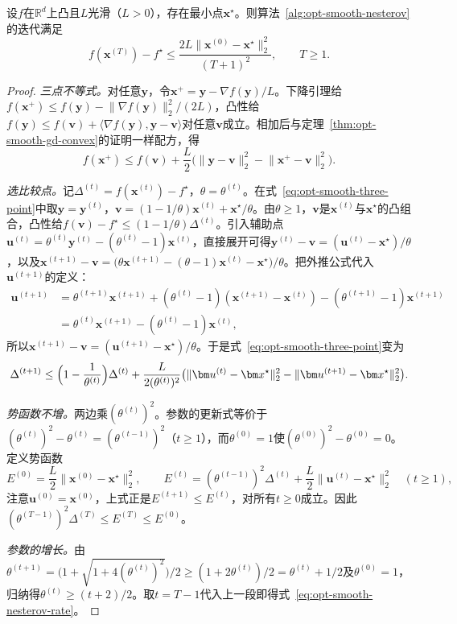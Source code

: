 \begin{theorem}[Nesterov方法的收敛速度]
\label{thm:opt-smooth-nesterov}
设$f$在$\mathbb R^d$上凸且$L$光滑（$L>0$），存在最小点$\bm x^\star$。则算法~\ref{alg:opt-smooth-nesterov}的迭代满足
\begin{equation}
\label{eq:opt-smooth-nesterov-rate}
  f(\bm x^{(T)})-f^\star\leq\frac{2L\lVert\bm x^{(0)}-\bm x^\star\rVert_2^2}{(T+1)^2},\qquad T\geq1 .
\end{equation}
\end{theorem}

\begin{proof}
\emph{三点不等式。}对任意$\bm y$，令$\bm x^+=\bm y-\nabla f(\bm y)/L$。下降引理给$f(\bm x^+)\leq f(\bm y)-\lVert\nabla f(\bm y)\rVert_2^2/(2L)$，凸性给$f(\bm y)\leq f(\bm v)+\langle\nabla f(\bm y),\bm y-\bm v\rangle$对任意$\bm v$成立。相加后与定理~\ref{thm:opt-smooth-gd-convex}的证明一样配方，得
\begin{equation}
\label{eq:opt-smooth-three-point}
  f(\bm x^+)\leq f(\bm v)+\frac L2\bigl(\lVert\bm y-\bm v\rVert_2^2-\lVert\bm x^+-\bm v\rVert_2^2\bigr).
\end{equation}

\emph{选比较点。}记$\Delta^{(t)}=f(\bm x^{(t)})-f^\star$，$\theta=\theta^{(t)}$。在式~\eqref{eq:opt-smooth-three-point}中取$\bm y=\bm y^{(t)}$，$\bm v=(1-1/\theta)\bm x^{(t)}+\bm x^\star/\theta$。由$\theta\geq1$，$\bm v$是$\bm x^{(t)}$与$\bm x^\star$的凸组合，凸性给$f(\bm v)-f^\star\leq(1-1/\theta)\Delta^{(t)}$。引入辅助点$\bm u^{(t)}=\theta^{(t)}\bm y^{(t)}-(\theta^{(t)}-1)\bm x^{(t)}$，直接展开可得$\bm y^{(t)}-\bm v=(\bm u^{(t)}-\bm x^\star)/\theta$，以及$\bm x^{(t+1)}-\bm v=\bigl(\theta\bm x^{(t+1)}-(\theta-1)\bm x^{(t)}-\bm x^\star\bigr)/\theta$。把外推公式代入$\bm u^{(t+1)}$的定义：
\[
  \begin{aligned}
  \bm u^{(t+1)}&=\theta^{(t+1)}\bm x^{(t+1)}+(\theta^{(t)}-1)(\bm x^{(t+1)}-\bm x^{(t)})-(\theta^{(t+1)}-1)\bm x^{(t+1)}\\
  &=\theta^{(t)}\bm x^{(t+1)}-(\theta^{(t)}-1)\bm x^{(t)},
  \end{aligned}
\]
所以$\bm x^{(t+1)}-\bm v=(\bm u^{(t+1)}-\bm x^\star)/\theta$。于是式~\eqref{eq:opt-smooth-three-point}变为
\[
  \Delta^{(t+1)}\leq\Bigl(1-\frac1{\theta^{(t)}}\Bigr)\Delta^{(t)}+\frac{L}{2(\theta^{(t)})^2}\bigl(\lVert\bm u^{(t)}-\bm x^\star\rVert_2^2-\lVert\bm u^{(t+1)}-\bm x^\star\rVert_2^2\bigr).
\]

\emph{势函数不增。}两边乘$(\theta^{(t)})^2$。参数的更新式等价于$(\theta^{(t)})^2-\theta^{(t)}=(\theta^{(t-1)})^2$（$t\geq1$），而$\theta^{(0)}=1$使$(\theta^{(0)})^2-\theta^{(0)}=0$。定义势函数
\[
  E^{(0)}=\frac L2\lVert\bm x^{(0)}-\bm x^\star\rVert_2^2,\qquad
  E^{(t)}=(\theta^{(t-1)})^2\Delta^{(t)}+\frac L2\lVert\bm u^{(t)}-\bm x^\star\rVert_2^2\quad(t\geq1),
\]
注意$\bm u^{(0)}=\bm x^{(0)}$，上式正是$E^{(t+1)}\leq E^{(t)}$，对所有$t\geq0$成立。因此$(\theta^{(T-1)})^2\Delta^{(T)}\leq E^{(T)}\leq E^{(0)}$。

\emph{参数的增长。}由$\theta^{(t+1)}=\bigl(1+\sqrt{1+4(\theta^{(t)})^2}\bigr)/2\geq(1+2\theta^{(t)})/2=\theta^{(t)}+1/2$及$\theta^{(0)}=1$，归纳得$\theta^{(t)}\geq(t+2)/2$。取$t=T-1$代入上一段即得式~\eqref{eq:opt-smooth-nesterov-rate}。
\end{proof}

